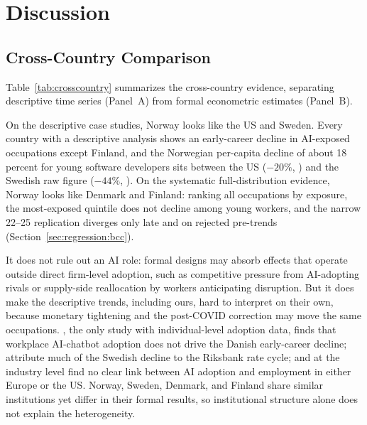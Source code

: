 \documentclass[12pt]{article}
\begin{document}
\section{Discussion}\label{sec:discussion}

\subsection{Cross-Country Comparison}\label{sec:discussion:crosscountry}

Table~\ref{tab:crosscountry} summarizes the cross-country evidence, separating descriptive time series (Panel~A) from formal econometric estimates (Panel~B).

On the descriptive case studies, Norway looks like the US and Sweden. Every country with a descriptive analysis shows an early-career decline in AI-exposed occupations except Finland, and the Norwegian per-capita decline of about 18 percent for young software developers sits between the US ($-20\%$, \citealp{brynjolfsson2025}) and the Swedish raw figure ($-44\%$, \citealp{lodefalk2026}). On the systematic full-distribution evidence, Norway looks like Denmark and Finland: ranking all occupations by exposure, the most-exposed quintile does not decline among young workers, and the narrow 22--25 replication diverges only late and on rejected pre-trends (Section~\ref{sec:regression:bcc}).

It does not rule out an AI role: formal designs may absorb effects that operate outside direct firm-level adoption, such as competitive pressure from AI-adopting rivals or supply-side reallocation by workers anticipating disruption. But it does make the descriptive trends, including ours, hard to interpret on their own, because monetary tightening and the post-COVID correction may move the same occupations. \citet{humlum2026}, the only study with individual-level adoption data, finds that workplace AI-chatbot adoption does not drive the Danish early-career decline; \citet{lodefalk2026} attribute much of the Swedish decline to the Riksbank rate cycle; and at the industry level \citet{bick2026} find no clear link between AI adoption and employment in either Europe or the US. Norway, Sweden, Denmark, and Finland share similar institutions yet differ in their formal results, so institutional structure alone does not explain the heterogeneity.


\end{document}

